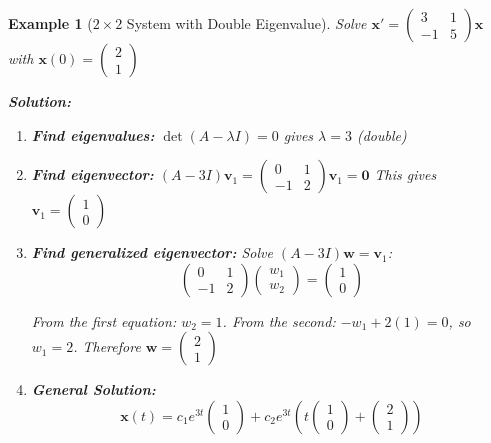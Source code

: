 \documentclass[12pt]{article}
\newtheorem{example}{Example}
\begin{document}
\begin{example}[$2\times2$ System with Double Eigenvalue]
Solve $\mathbf{x}' = \begin{pmatrix} 3 & 1 \\ -1 & 5 \end{pmatrix}\mathbf{x}$ with $\mathbf{x}(0) = \begin{pmatrix} 2 \\ 1 \end{pmatrix}$

\textbf{Solution:}
\begin{enumerate}
\item \textbf{Find eigenvalues:} $\det(A - \lambda I) = 0$ gives $\lambda = 3$ (double)

\item \textbf{Find eigenvector:}
$(A - 3I)\mathbf{v}_{1} = \begin{pmatrix} 0 & 1 \\ -1 & 2 \end{pmatrix}\mathbf{v}_{1} = \mathbf{0}$
This gives $\mathbf{v}_{1} = \begin{pmatrix} 1 \\ 0 \end{pmatrix}$

\item \textbf{Find generalized eigenvector:}
Solve $(A - 3I)\mathbf{w} = \mathbf{v}_{1}$:
\[\begin{pmatrix} 0 & 1 \\ -1 & 2 \end{pmatrix}\begin{pmatrix} w_{1} \\ w_{2} \end{pmatrix} = \begin{pmatrix} 1 \\ 0 \end{pmatrix}\]

From the first equation: $w_{2} = 1$. From the second: $-w_{1} + 2(1) = 0$, so $w_{1} = 2$.
Therefore $\mathbf{w} = \begin{pmatrix} 2 \\ 1 \end{pmatrix}$

\item \textbf{General Solution:}
\[\mathbf{x}(t) = c_{1} e^{3t}\begin{pmatrix} 1 \\ 0 \end{pmatrix} + c_{2} e^{3t}\left(t\begin{pmatrix} 1 \\ 0 \end{pmatrix} + \begin{pmatrix} 2 \\ 1 \end{pmatrix}\right)\]


\end{enumerate}
\end{example}
\end{document}
